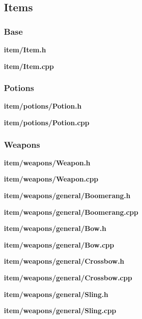 \documentclass[../Main.tex]{subfiles}
\begin{document}
    \subsection{Items}
        \subsubsection{Base}
            \textbf{item/Item.h}
            
            \textbf{item/Item.cpp}
            

        \subsubsection{Potions}
            \textbf{item/potions/Potion.h}
            
            \textbf{item/potions/Potion.cpp}
            

        \subsubsection{Weapons}
            \textbf{item/weapons/Weapon.h}
            
            \textbf{item/weapons/Weapon.cpp}
            

            \textbf{item/weapons/general/Boomerang.h}
            
            \textbf{item/weapons/general/Boomerang.cpp}
            

            \textbf{item/weapons/general/Bow.h}
            
            \textbf{item/weapons/general/Bow.cpp}
            

            \textbf{item/weapons/general/Crossbow.h}
            
            \textbf{item/weapons/general/Crossbow.cpp}
            

            \textbf{item/weapons/general/Sling.h}
            
            \textbf{item/weapons/general/Sling.cpp}
            
\end{document}

